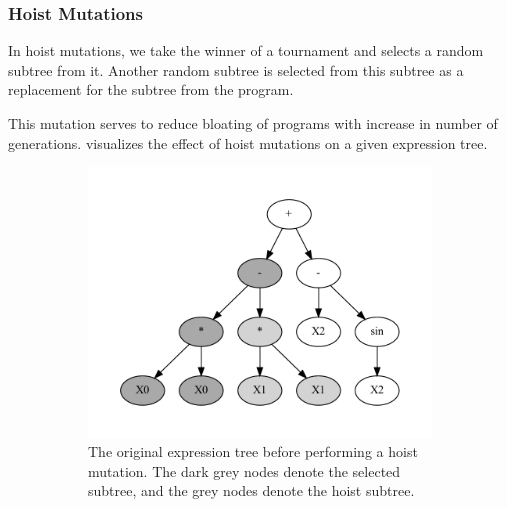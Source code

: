 \subsubsection{Hoist Mutations}
\label{subsec:hoist}
In hoist mutations, we take the winner of a tournament and selects a random subtree from it. Another random subtree is selected from this subtree as a replacement for the subtree from the program. 

This mutation serves to reduce bloating of programs with increase in number of generations.  visualizes the effect of hoist mutations on a given expression tree.

\begin{figure}[htp]
  \centering
  \begin{subfigure}{\textwidth}
    \centering
    \includegraphics[scale=0.8]{images/graphviz/hoist_mut_before.dot.pdf}
    \caption{The original expression tree before performing a hoist mutation. The dark grey nodes denote the selected subtree, and the grey nodes denote the hoist subtree.}
    \label{fig:hoist_muta}
  \end{subfigure}%
  \\
  \begin{subfigure}{\textwidth}
    \centering

\end{subfigure}
\end{figure}
